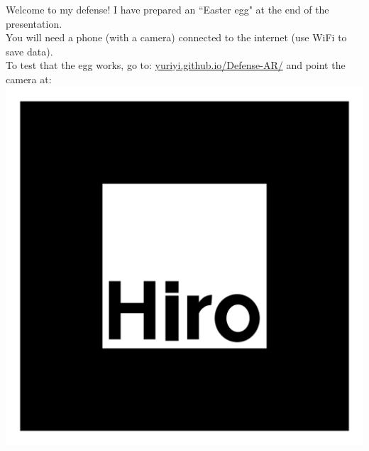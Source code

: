 \documentclass[a4paper,12pt]{letter}
\begin{document}
\Large\thispagestyle{empty}
\centering
Welcome to my defense!
\vskip1cm
I have prepared an ``Easter egg" at the end of the presentation.\\[1em]
You will need a phone (with a camera) connected to the internet (use WiFi to save data).\\[1em]
To test that the egg works, go to:
\url{yuriyi.github.io/Defense-AR/}
and point the camera at:
\includegraphics[width=\textwidth]{../source/images/test}
\end{document}
